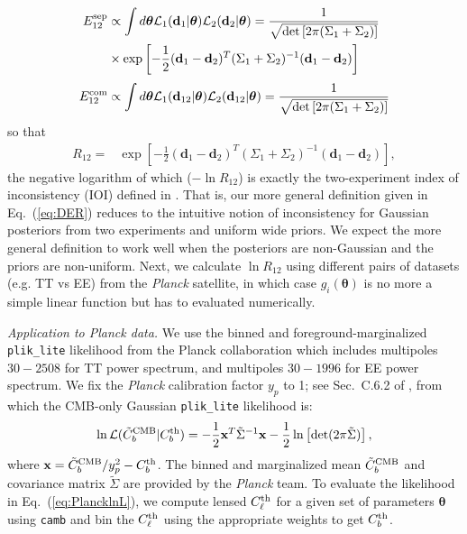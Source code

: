 \documentclass[amsmath, amssymb, reprint, aps]{revtex4-1}
\newcommand{\xv}{\textbf{x}}
\newcommand{\dv}{\textbf{d}}
\newcommand{\donev}{\textbf{d}_1}
\newcommand{\dtwov}{\textbf{d}_2}
\newcommand{\tv}{\bm{\theta}}
\begin{document}
{    \begin{align}
        \nonumber
        E_{12}^{\rm sep} &\propto \int d\tv \mathcal{L}_1(\dv_1|\tv) \mathcal{L}_2(\dv_2|\tv) 
        = \frac{1}{\sqrt{\det\left[2\pi(\Sigma_1+\Sigma_2)\right]}} \\ & \times\exp \left[-\frac{1}{2}(\donev-\dtwov)^T(\Sigma_1+\Sigma_2)^{-1}(\donev-\dtwov)\right] 
        \\[0.1cm]
        E_{12}^{\rm com} &\propto \int d\tv \mathcal{L}_1(\dv_{12}|\tv) \mathcal{L}_2(\dv_{12}|\tv)  
        = \frac{1}{\sqrt{\det\left[2\pi(\Sigma_1 + \Sigma_2)\right]}}
        \nonumber
    \end{align}
    so that
     \begin{align}
        \!\!\!
        R_{12} =& \exp \left[-\frac{1}{2}(\donev-\dtwov)^T(\Sigma_1+\Sigma_2)^{-1}(\donev-\dtwov)\right], \label{eq:R12NGaus}
    \end{align}
    the {negative} logarithm of which ($-\ln R_{12}$) is exactly the two-experiment index of inconsistency (IOI) defined in \cite{Lin:2017ikq}. That is, our more general definition given in Eq.~(\ref{eq:DER}) reduces to the intuitive notion of inconsistency for Gaussian posteriors from two experiments and uniform wide priors. We expect the more general definition to work well when the posteriors are non-Gaussian and the priors are non-uniform. Next, we calculate $\ln R_{12}$ using different pairs of datasets (e.g. TT vs EE) from the {\it Planck} satellite, in which case $g_i(\tv)$ is no more a simple linear function but has to evaluated numerically.
        
    \medskip
    \textit{Application to Planck data.} 
    We use the binned and foreground-marginalized \texttt{plik\_lite} likelihood from the Planck collaboration \cite{Aghanim:2015xee} which includes multipoles $30-2508$ for TT power spectrum, and multipoles $30-1996$ for EE power spectrum. We fix the {\it Planck} calibration factor $y_p$ to 1; see Sec.\ C.6.2 of \cite{Aghanim:2015xee}, from which the CMB-only Gaussian \texttt{plik\_lite} likelihood is:
        \begin{align}
            \ln \mathcal{L}(\tilde{C}_b^{\rm CMB}|C_b^{\rm th}) = -\frac{1}{2}\xv^T \tilde{\Sigma}^{-1} \xv -\frac{1}{2} \ln \left[ \det(2\pi \tilde{\Sigma})\right], \label{eq:PlancklnL}
        \end{align}
    where $\xv = \tilde{C}_b^{\rm CMB}/y_p^2 - C_b^{\rm th}$. The binned and marginalized mean $\tilde{C}_b^{\rm CMB}$ and covariance matrix $\tilde{\Sigma}$ are provided by the {\it Planck} team. To evaluate the likelihood in Eq.~(\ref{eq:PlancklnL}), we compute lensed $C_\ell^{\rm th}$ for a given set of parameters $\tv$ using \texttt{camb} \cite{Lewis:1999bs,Howlett:2012mh} and bin the $C_\ell^{\rm th}$ using the appropriate weights to get $C_b^{\rm th}$.
        
}
\end{document}
